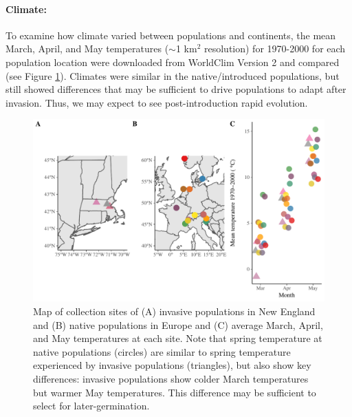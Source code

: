 \documentclass[12pt]{article}\usepackage[]{graphicx}\usepackage[]{color}
\begin{document}
	\paragraph{Climate:} 
	To examine how climate varied between populations and continents, the mean March, April, and May temperatures ($\sim$1 km$^2$ resolution) for 1970-2000 for each population location were downloaded from WorldClim Version 2 \parencite{Fick2017}  and compared (see Figure \ref{fig:sites}). Climates were similar in the native/introduced populations, but still showed differences that may be sufficient to drive populations to adapt after invasion. Thus, we may expect to see post-introduction rapid evolution.
	
	
	\begin{figure} 
		\centering
		\includegraphics[width=1 \textwidth,trim=0cm 0cm 0cm 0cm, angle=0, scale=.9, origin=c,clip=false]{sampling_sites}
		\caption{Map of collection sites of (A) invasive populations in New England and (B) native populations in Europe and (C) average March, April, and May temperatures at each site. Note that spring temperature at native populations (circles) are similar to spring temperature experienced by invasive populations (triangles), but also show key differences: invasive populations show colder March temperatures but warmer May temperatures. This difference may be sufficient to select for later-germination.} 
		\label{fig:sites}
	\end{figure}
\end{document}
